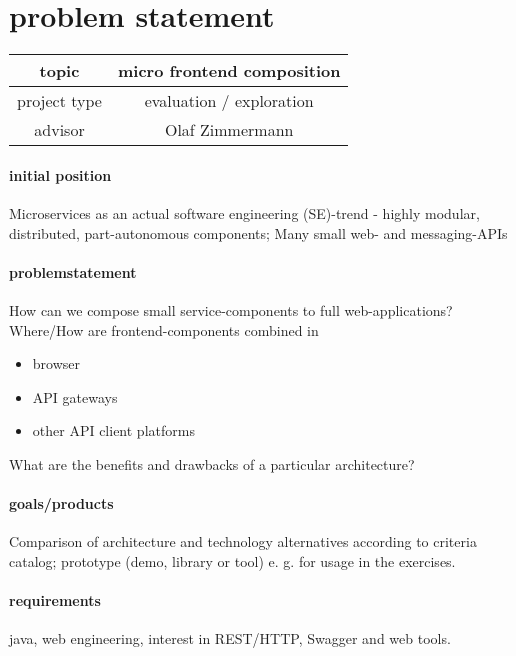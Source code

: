 
\section{problem statement}

\begin{tabular}{| c | c |}
    \hline
    topic & micro frontend composition \\\hline
    project type & evaluation / exploration \\\hline
    advisor & Olaf Zimmermann \\\hline
\end{tabular}

\paragraph{initial position} Microservices as an actual software engineering (SE)-trend - highly modular, distributed, part-autonomous components; Many small web- and messaging-APIs
\paragraph{problemstatement} 
How can we compose small service-components to full web-applications? Where/How are frontend-components combined in
\begin{itemize}
    \item browser
    \item API gateways
    \item other API client platforms
\end{itemize}

What are the benefits and drawbacks of a particular architecture?

\paragraph{goals/products} Comparison of architecture and technology alternatives according
to criteria catalog; prototype (demo, library or tool) e. g. for usage in the exercises.

\paragraph{requirements} java, web engineering, interest in REST/HTTP, Swagger and web tools.